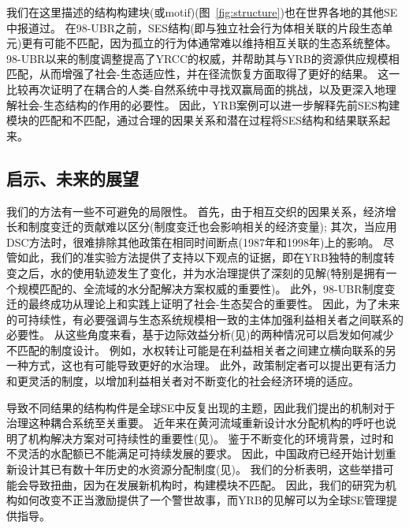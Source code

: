 我们在这里描述的结构构建块(或motif)(图~\ref{fig:structure})也在世界各地的其他SE中报道过。
在98-UBR之前，SES结构(即与独立社会行为体相关联的片段生态单元)更有可能不匹配，因为孤立的行为体通常难以维持相互关联的生态系统整体\cite{sayles2017,sayles2019,cai2016,bergsten2019}。
98-UBR以来的制度调整提高了YRCC的权威，并帮助其与YRB的资源供应规模相匹配，从而增强了社会-生态适应性，并在径流恢复方面取得了更好的结果\cite{cumming2020a,wang2019d}。
这一比较再次证明了在耦合的人类-自然系统\cite{hegwood2022}中寻找双赢局面的挑战，以及更深入地理解社会-生态结构\cite{bergsten2019, sayles2019}的作用的必要性。
因此，YRB案例可以进一步解释先前SES构建模块的匹配和不匹配，通过合理的因果关系和潜在过程将SES结构和结果联系起来。



\subsection{启示、未来的展望}
我们的方法有一些不可避免的局限性。
首先，由于相互交织的因果关系，经济增长和制度变迁的贡献难以区分(制度变迁也会影响相关的经济变量);
其次，当应用DSC方法时，很难排除其他政策在相同时间断点(1987年和1998年)上的影响。
尽管如此，我们的准实验方法提供了支持以下观点的证据，即在YRB独特的制度转变之后，水的使用轨迹发生了变化，并为水治理提供了深刻的见解(特别是拥有一个规模匹配的、全流域的水分配解决方案权威的重要性\cite{bodin2017b, ostrom2009, reyers2018})。
此外，98-UBR制度变迁的最终成功从理论上和实践上证明了社会-生态契合的重要性。
因此，为了未来的可持续性，有必要强调与生态系统规模相一致的主体加强利益相关者之间联系的必要性。
从这些角度来看，基于边际效益分析(见\textit{})的两种情况可以启发如何减少不匹配的制度设计。
例如，水权转让可能是在利益相关者之间建立横向联系的另一种方式，这也有可能导致更好的水治理。
此外，政策制定者可以提出更有活力和更灵活的制度，以增加利益相关者对不断变化的社会经济环境的适应\cite{reyers2018}。

导致不同结果的结构构件是全球SE中反复出现的主题，因此我们提出的机制对于治理这种耦合系统至关重要。
近年来在黄河流域重新设计水分配机构的呼吁也说明了机构解决方案对可持续性的重要性(见\textit{})。
鉴于不断变化的环境背景，过时和不灵活的水配额已不能满足可持续发展的要求\cite{wang2019a}。
因此，中国政府已经开始计划重新设计其已有数十年历史的水资源分配制度(见\textit{})。
我们的分析表明，这些举措可能会导致扭曲，因为在发展新机构\cite{bodin2017b}时，构建模块不匹配。
因此，我们的研究为机构如何改变不正当激励提供了一个警世故事\cite{hegwood2022}，而YRB的见解可以为全球SE管理提供指导\cite{muneepeerakul2017, leslie2015}。

